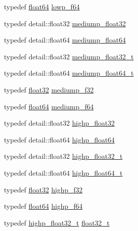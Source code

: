 \begin{DoxyCompactItemize}
\item 
typedef \hyperlink{group__gtc__type__precision_gab721f828b41f46b20cf4883b50733d3b}{float64} \hyperlink{group__gtc__type__precision_ga59839f4bf6b97c93b0def577890bbfb8}{lowp\-\_\-f64}
\item 
typedef detail\-::float32 \hyperlink{group__gtc__type__precision_ga1b5f74cbeed0c9d42cd57d77609be7ee}{mediump\-\_\-float32}
\item 
typedef detail\-::float64 \hyperlink{group__gtc__type__precision_ga9225ae6aed0f90b6eb65bf8d466199c1}{mediump\-\_\-float64}
\item 
typedef detail\-::float32 \hyperlink{group__gtc__type__precision_gacbd406715148db96c9d9d2a2ef6460de}{mediump\-\_\-float32\-\_\-t}
\item 
typedef detail\-::float64 \hyperlink{group__gtc__type__precision_ga97a0747b103eb5ef320a91888de52f51}{mediump\-\_\-float64\-\_\-t}
\item 
typedef \hyperlink{group__gtc__type__precision_ga814f2f65354b6588b067cc5c67a6b340}{float32} \hyperlink{group__gtc__type__precision_ga3dbba6bd06a546d7a11d1c09c2f04b1a}{mediump\-\_\-f32}
\item 
typedef \hyperlink{group__gtc__type__precision_gab721f828b41f46b20cf4883b50733d3b}{float64} \hyperlink{group__gtc__type__precision_gabd273bd38ea5e013aeec9ffd2b2591fb}{mediump\-\_\-f64}
\item 
typedef detail\-::float32 \hyperlink{group__gtc__type__precision_ga91af7513c1102410646f2c435ca29be5}{highp\-\_\-float32}
\item 
typedef detail\-::float64 \hyperlink{group__gtc__type__precision_gab871a78c548d2fa53e1e8ec64a46eee7}{highp\-\_\-float64}
\item 
typedef detail\-::float32 \hyperlink{group__gtc__type__precision_ga4e16a7818d09e2da3b81765999f23928}{highp\-\_\-float32\-\_\-t}
\item 
typedef detail\-::float64 \hyperlink{group__gtc__type__precision_gae8b3b2ace5be2a61c6bf63f12643fa15}{highp\-\_\-float64\-\_\-t}
\item 
typedef \hyperlink{group__gtc__type__precision_ga814f2f65354b6588b067cc5c67a6b340}{float32} \hyperlink{group__gtc__type__precision_ga48d80b6fd3a40b71b2e414493832d1ca}{highp\-\_\-f32}
\item 
typedef \hyperlink{group__gtc__type__precision_gab721f828b41f46b20cf4883b50733d3b}{float64} \hyperlink{group__gtc__type__precision_gab1306a5a8ae99fb2867b548b1546bbe0}{highp\-\_\-f64}
\item 
typedef \hyperlink{group__gtc__type__precision_ga4e16a7818d09e2da3b81765999f23928}{highp\-\_\-float32\-\_\-t} \hyperlink{group__gtc__type__precision_ga642737ae3e7c434b366f2191e6944bf2}{float32\-\_\-t}

\end{DoxyCompactItemize}
